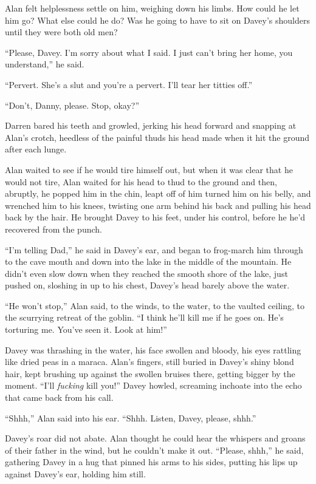 Alan felt helplessness settle on him, weighing down his limbs.  How
could he let him go?  What else could he do?  Was he going to have to
sit on Davey's shoulders until they were both old men?

``Please, Davey.  I'm sorry about what I said.  I just can't bring her
home, you understand,'' he said.

``Pervert.  She's a slut and you're a pervert.  I'll tear her titties
off.''

``Don't, Danny, please.  Stop, okay?''

Darren bared his teeth and growled, jerking his head forward and
snapping at Alan's crotch, heedless of the painful thuds his head made
when it hit the ground after each lunge.

Alan waited to see if he would tire himself out, but when it was clear
that he would not tire, Alan waited for his head to thud to the ground
and then, abruptly, he popped him in the chin, leapt off of him turned
him on his belly, and wrenched him to his knees, twisting one arm
behind his back and pulling his head back by the hair.  He brought
Davey to his feet, under his control, before he he'd recovered from
the punch.

``I'm telling Dad,'' he said in Davey's ear, and began to frog-march
him through to the cave mouth and down into the lake in the middle of
the mountain.  He didn't even slow down when they reached the smooth
shore of the lake, just pushed on, sloshing in up to his chest,
Davey's head barely above the water.

``He won't stop,'' Alan said, to the winds, to the water, to the
vaulted ceiling, to the scurrying retreat of the goblin.  ``I think
he'll kill me if he goes on.  He's torturing me.  You've seen it. 
Look at him!''

Davey was thrashing in the water, his face swollen and bloody, his
eyes rattling like dried peas in a maraca.  Alan's fingers, still
buried in Davey's shiny blond hair, kept brushing up against the
swollen bruises there, getting bigger by the moment.  ``I'll
\textit{fucking} kill you!'' Davey howled, screaming inchoate into the
echo that came back from his call.

``Shhh,'' Alan said into his ear.  ``Shhh.  Listen, Davey, please,
shhh.''

Davey's roar did not abate.  Alan thought he could hear the whispers
and groans of their father in the wind, but he couldn't make it out. 
``Please, shhh,'' he said, gathering Davey in a hug that pinned his
arms to his sides, putting his lips up against Davey's ear, holding
him still.

